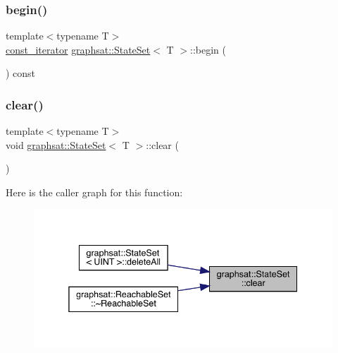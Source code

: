 \subsubsection{\texorpdfstring{begin()}{begin()}\hspace{0.1cm}{\footnotesize\ttfamily [2/2]}}
{\footnotesize\ttfamily template$<$typename T$>$ \\
\mbox{\hyperlink{classgraphsat_1_1_state_set_1_1const__iterator}{const\+\_\+iterator}} \mbox{\hyperlink{classgraphsat_1_1_state_set}{graphsat\+::\+State\+Set}}$<$ T $>$\+::begin (\begin{DoxyParamCaption}{ }\end{DoxyParamCaption}) const\hspace{0.3cm}{\ttfamily [inline]}}

\mbox{\label{classgraphsat_1_1_state_set_aadb01d38275e5dee296850aa974000de}} 
\subsubsection{\texorpdfstring{clear()}{clear()}}
{\footnotesize\ttfamily template$<$typename T$>$ \\
void \mbox{\hyperlink{classgraphsat_1_1_state_set}{graphsat\+::\+State\+Set}}$<$ T $>$\+::clear (\begin{DoxyParamCaption}{ }\end{DoxyParamCaption})\hspace{0.3cm}{\ttfamily [inline]}}

Here is the caller graph for this function\+:
\nopagebreak
\begin{figure}[H]
\begin{center}
\leavevmode
\includegraphics[width=338pt]{classgraphsat_1_1_state_set_aadb01d38275e5dee296850aa974000de_icgraph}
\end{center}
\end{figure}
\mbox{\label{classgraphsat_1_1_state_set_a8302bab8034c6f16cf9adbbd84b3a535}} 
